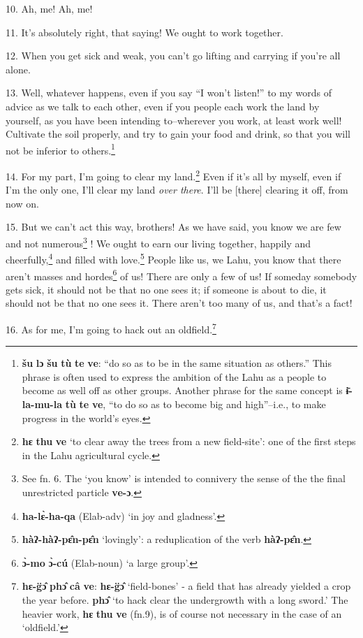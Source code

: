 10. Ah, me! Ah, me!

11. It's absolutely right, that saying! We ought to work together.

12. When you get sick and weak, you can't go lifting and carrying if you're all
alone.

13. Well, whatever happens, even if you say ``I won't listen!''
to my words of advice as we talk to each other, even if you people each work the
land by yourself, as you have been intending to--wherever you work, at least work
well! Cultivate the soil properly, and try to gain your food and drink, so that
you will not be inferior to others.\footnote{\textbf{šu} \textbf{lɔ} \textbf{šu} \textbf{tù} \textbf{te} \textbf{ve}: ``do so as to be in the same situation as others.'' This phrase is often used to express the ambition of the Lahu as a people to become as well off as other groups. Another phrase for the same concept is \textbf{ɨ̄-la-mu-la} \textbf{tù} \textbf{te} \textbf{ve}, ``to do so as to become big and high''--i.e., to make progress in the world's eyes.}

14. For my part, I'm going to clear my land.\footnote{\textbf{hɛ} \textbf{thu} \textbf{ve} `to clear away the trees from a new field-site': one of the first steps in the Lahu agricultural cycle.} Even if it's all by myself, even
if I'm the only one, I'll clear my land \textit{over there}. I'll be [there] clearing
it off, from now on.

15. But we can't act this way, brothers! As we have said, you know we are few and
not numerous\footnote{See fn. 6. The `you know' is intended to connivery the sense of the the final unrestricted particle \textbf{ve-ɔ}.} ! We ought to earn our living together, happily and cheerfully,\footnote{\textbf{ha-lɛ̀-ha-qa} (Elab-adv) `in joy and gladness'.}
and filled with love.\footnote{\textbf{hàʔ-hàʔ-pɛ̂n-pɛ̂n} `lovingly': a reduplication of the verb \textbf{hàʔ-pɛ̂n}.} People like us, we Lahu, you know that there aren't
masses and hordes\footnote{\textbf{ɔ̀-mo} \textbf{ɔ̀-cú} (Elab-noun) `a large group'.} of us! There are only a few of us! If someday somebody gets
sick, it should not be that no one sees it; if someone is about to die, it should
not be that no one sees it. There aren't too many of us, and that's a fact!

16. As for me, I'm going to hack out an oldfield.\footnote{\textbf{hɛ-g̈ɔ̂} \textbf{phɔ̂} \textbf{câ} \textbf{ve}: \textbf{hɛ-g̈ɔ̂} `field-bones' - a field that has already yielded a crop the year before. \textbf{phɔ̂} `to hack clear the undergrowth with a long sword.' The heavier work, \textbf{hɛ} \textbf{thu} \textbf{ve} (fn.9), is of course not necessary in the case of an `oldfield.'}

